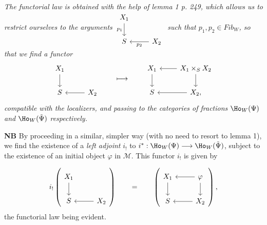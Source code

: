 
\textit{The functorial law is obtained with the help of lemma 1 p. 249, which allows us to restrict ourselves to the arguments $\begin{tikzcd}[ampersand replacement=\&] X_1 \arrow[d, "p_1"'] \& \\ S \& X_2 \arrow[l, "p_2"] \end{tikzcd}$ such that $p_1,p_2\in \mathit{Fib}_W$, so that we find a functor}
\[
\begin{tikzcd}[ampersand replacement=\&]
X_1 \arrow[d] \& \\
S \& X_2 \arrow[l]
\end{tikzcd}
\qquad\longmapsto\qquad
\begin{tikzcd}[ampersand replacement=\&]
X_1 \arrow[d] \& X_1\times_S X_2 \arrow[l] \arrow[d] \\
S \& X_2, \arrow[l]
\end{tikzcd}
\]
\textit{compatible with the localizers, and passing to the categories of fractions} $\Ho_W(\Psi)$ \textit{and} $\Ho_W(\tilde{\Psi})$ \textit{respectively.}

\textbf{NB} By proceeding in a similar, simpler way (with no need to resort to lemma 1), we find the existence of a \textit{left adjoint} $i_!$ to $i^* : \Ho_W(\Psi)\longrightarrow \Ho_W(\tilde{\Psi})$, subject to the existence of an initial object $\varphi$ in $\mathcal{M}$. This functor $i_!$ is given by %

\[
i_!\left(
\begin{tikzcd}[ampersand replacement=\&]
X_1 \arrow[d] \& \\
S \& X_2 \arrow[l]
\end{tikzcd}
\right)
\qquad = \qquad
\left(
\begin{tikzcd}[ampersand replacement=\&]
X_1 \arrow[d] \& \varphi \arrow[l] \arrow[d] \\
S \& X_2 \arrow[l]
\end{tikzcd}
\right),
\]
the functorial law being evident.

